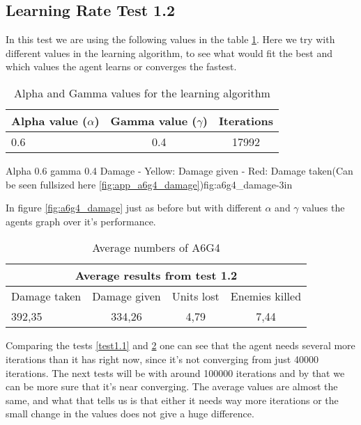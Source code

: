 \subsection*{Learning Rate Test 1.2}
In this test we are using the following values in the table \ref{a6g4_table}. Here we try with different values in the learning algorithm, to see what would fit the best and which values the agent learns or converges the fastest.


\begin{centering}
\begin{table}[H]
 \begin{tabular}{|l|c|c|}
	\hline
		Alpha value ($\alpha$) & Gamma value ($\gamma$) & Iterations\\
	\hline
		0.6 & 0.4 & 17992 \\
	\hline
\end{tabular}
\label{a6g4_table}
\caption{Alpha and Gamma values for the learning algorithm}
\end{table}
\end{centering}


			{Alpha 0.6 gamma 0.4 Damage - Yellow: Damage given - Red: Damage taken(Can be seen fullsized here \ref{fig:app_a6g4_damage})}{fig:a6g4_damage}{-3in}

In figure \ref{fig:a6g4_damage} just as before but with different $\alpha$ and $\gamma$ values the agents graph over it's performance.






\begin{centering}
\begin{table}
 \begin{tabular}{|l|c|c|c|}
	\multicolumn{4}{c}{Average results from test 1.2} \\
	\hline
		Damage taken & Damage given & Units lost & Enemies killed\\
	\hline
		392,35 & 334,26 & 4,79 & 7,44 \\
	\hline
\end{tabular}
\caption{Average numbers of A6G4}
\label{test1.2}
\end{table}
\end{centering}

Comparing the tests \ref{test1.1} and \ref{test1.2} one can see that the agent needs several more iterations than it has right now, since it's not converging from just 40000 iterations. The next tests will be with around 100000 iterations and by that we can be more sure that it's near converging. The average values are almost the same, and what that tells us is that either it needs way more iterations or the small change in the values does not give a huge difference.